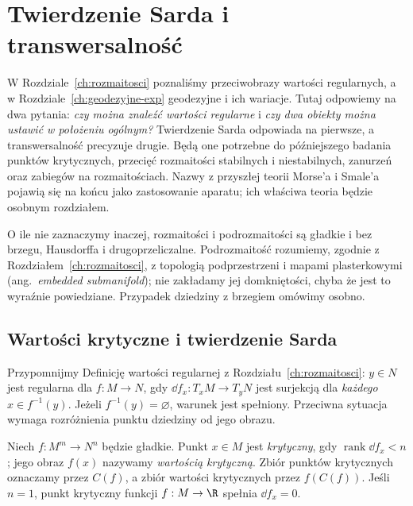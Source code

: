 \chapter{Twierdzenie Sarda i transwersalność}
\label{ch:sard-transwersalnosc}

W Rozdziale~\ref{ch:rozmaitosci} poznaliśmy przeciwobrazy
wartości regularnych, a w Rozdziale~\ref{ch:geodezyjne-exp}
geodezyjne i ich wariacje. Tutaj odpowiemy na dwa pytania:
\emph{czy można znaleźć wartości regularne} i
\emph{czy dwa obiekty można ustawić w położeniu ogólnym?}
Twierdzenie Sarda odpowiada na pierwsze, a transwersalność
precyzuje drugie. Będą one potrzebne do późniejszego
badania punktów krytycznych, przecięć rozmaitości
stabilnych i niestabilnych, zanurzeń oraz zabiegów na
rozmaitościach. Nazwy z przyszłej teorii Morse'a i
Smale'a pojawią się na końcu jako zastosowanie aparatu;
ich właściwa teoria będzie osobnym rozdziałem.

O ile nie zaznaczymy inaczej, rozmaitości i podrozmaitości
są gładkie i bez brzegu, Hausdorffa i drugoprzeliczalne.
Podrozmaitość rozumiemy, zgodnie z Rozdziałem~\ref{ch:rozmaitosci},
z topologią podprzestrzeni i mapami plasterkowymi
(ang.\ \emph{embedded submanifold}); nie zakładamy jej
domkniętości, chyba że jest to wyraźnie powiedziane.
Przypadek dziedziny z brzegiem omówimy osobno.

\section{Wartości krytyczne i twierdzenie Sarda}
\label{sec:sard}

Przypomnijmy Definicję wartości regularnej z
Rozdziału~\ref{ch:rozmaitosci}: $y\in N$ jest regularna
dla $f:M\to N$, gdy $\dd f_x:T_xM\to T_yN$ jest
surjekcją dla \emph{każdego} $x\in f^{-1}(y)$.
Jeżeli $f^{-1}(y)=\varnothing$, warunek jest spełniony.
Przeciwna sytuacja wymaga rozróżnienia punktu dziedziny
od jego obrazu.

\begin{definicja}
\label{def:sard-krytyczne}
Niech $f:M^m\to N^n$ będzie gładkie.
Punkt $x\in M$ jest \emph{krytyczny}, gdy
$\operatorname{rank}\dd f_x<n$; jego obraz $f(x)$
nazywamy \emph{wartością krytyczną}. Zbiór punktów
krytycznych oznaczamy przez $C(f)$, a zbiór wartości
krytycznych przez $f(C(f))$. Jeśli $n=1$, punkt
krytyczny funkcji $f:M\to\R$ spełnia $\dd f_x=0$.
\end{definicja}

